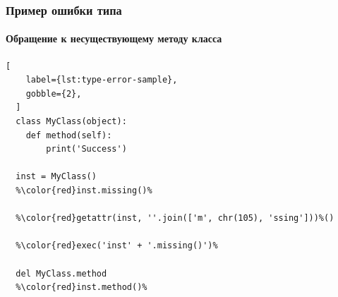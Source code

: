 \documentclass[handout]{beamer}
\begin{document}
\begin{frame}[fragile]
  \frametitle{Пример ошибки типа}
  \framesubtitle{Обращение к несуществующему методу класса}

  \begin{lstlisting}[
    label={lst:type-error-sample},
    gobble={2},
  ]
  class MyClass(object):
    def method(self):
        print('Success')

  inst = MyClass()
  %\color{red}inst.missing()%

  %\color{red}getattr(inst, ''.join(['m', chr(105), 'ssing']))%()

  %\color{red}exec('inst' + '.missing()')%
  
  del MyClass.method
  %\color{red}inst.method()%

  \end{lstlisting}
    
\end{frame}

\end{document}
